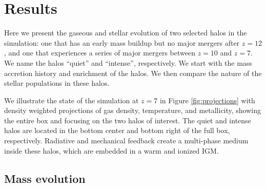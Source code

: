 \documentclass[apjl]{emulateapj}
\begin{document}
\section{Results}
\label{sec:results}

\begin{figure*}
  \caption{\label{fig:projections} Density-weighted projections of gas
    density (top), temperature (middle), and metallicity (bottom) at
    $z=7$.  The left column shows the entire simulation volume, where
    the center and right columns focus on the intense and quiet halos,
    which are marked by arrows in the upper-left panel.  The
    metallicity projections are a composite picture of metals
    originating from Pop III (red) and Pop II (blue) stars with purple
    indicating a mixture of the two.}
\end{figure*}

Here we present the gaseous and stellar evolution of two selected
halos in the simulation: one that has an early mass buildup but no
major mergers after $z=12$, and one that experiences a series of major
mergers between $z=10$ and $z=7$.  We name the halos ``quiet'' and
``intense'', respectively.  We start with the mass accretion history
and enrichment of the halos.  We then compare the nature of the
stellar populations in these halos.

We illustrate the state of the simulation at $z=7$ in Figure
\ref{fig:projections} with density weighted projections of gas
density, temperature, and metallicity, showing the entire box and
focusing on the two halos of interest.  The quiet and intense halos
are located in the bottom center and bottom right of the full box,
respectively.  Radiative and mechanical feedback create a multi-phase
medium inside these halos, which are embedded in a warm and ionized
IGM.

\subsection{Mass evolution}
\label{sec:halo}

\begin{figure*}
  \caption{\label{fig:evo} (a) Evolution of the total halo
    mass (top), stellar mass (middle), and gas fraction (bottom) of
    the quiet (dashed) and intense (solid) halos.  (b)
    Mass-weighted stellar metallicities and gas metallicities enriched
    by Pop II and Pop III SNe of the intense (top) and quiet (bottom)
    halos.}
\end{figure*}
\end{document}
